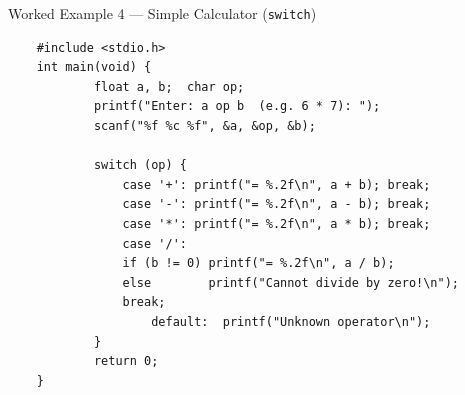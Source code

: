 \documentclass[aspectratio=169]{beamer}
\begin{document}
	\begin{frame}[fragile]{Worked Example 4 --- Simple Calculator (\texttt{switch})}
\begin{lstlisting}
	#include <stdio.h>
	int main(void) {
			float a, b;  char op;
			printf("Enter: a op b  (e.g. 6 * 7): ");
			scanf("%f %c %f", &a, &op, &b);
			
			switch (op) {
				case '+': printf("= %.2f\n", a + b); break;
				case '-': printf("= %.2f\n", a - b); break;
				case '*': printf("= %.2f\n", a * b); break;
				case '/':
				if (b != 0) printf("= %.2f\n", a / b);
				else        printf("Cannot divide by zero!\n");
				break;
					default:  printf("Unknown operator\n");
			}
			return 0;
	}
\end{lstlisting}
	\end{frame}
	
	
	
\end{document}
